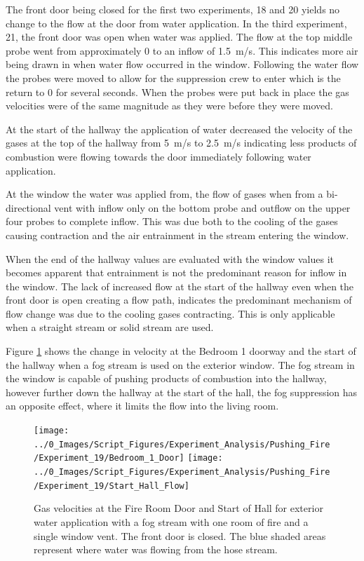 \documentclass[12pt,oneside]{book}
\begin{document}
The front door being closed for the first two experiments, 18 and 20 yields no change to the flow at the door from water application. In the third experiment, 21, the front door was open when water was applied. The flow at the top middle probe went from approximately 0 to an inflow of 1.5~m/s. This indicates more air being drawn in when water flow occurred in the window. Following the water flow the probes were moved to allow for the suppression crew to enter which is the return to 0 for several seconds. When the probes were put back in place the gas velocities were of the same magnitude as they were before they were moved. 

At the start of the hallway the application of water decreased the velocity of the gases at the top of the hallway from 5~m/s to 2.5~m/s indicating less products of combustion were flowing towards the door immediately following water application.

At the window the water was applied from, the flow of gases when from a bi-directional vent with inflow only on the bottom probe and outflow on the upper four probes to complete inflow. This was due both to the cooling of the gases causing contraction and the air entrainment in the stream entering the window. 

When the end of the hallway values are evaluated with the window values it becomes apparent that entrainment is not the predominant reason for inflow in the window. The lack of increased flow at the start of the hallway even when the front door is open creating a flow path, indicates the predominant mechanism of flow change was due to the cooling gases contracting. This is only applicable when a straight stream or solid stream are used. 

Figure \ref{fig:push_fire_dead_end_fog} shows the change in velocity at the Bedroom 1 doorway and the start of the hallway when a fog stream is used on the exterior window.  The fog stream in the window is capable of pushing products of combustion into the hallway, however further down the hallway at the start of the hall, the fog suppression has an opposite effect, where it limits the flow into the living room. 

\begin{figure}[H]
\centering
\texttt{[image: ../0\_Images/Script\_Figures/Experiment\_Analysis/Pushing\_Fire/Experiment\_19/Bedroom\_1\_Door]}
\texttt{[image: ../0\_Images/Script\_Figures/Experiment\_Analysis/Pushing\_Fire/Experiment\_19/Start\_Hall\_Flow]}
\caption[Gas Velocities - Single Room of Fire - Exterior Fog]{Gas velocities at the Fire Room Door and Start of Hall for exterior water application with a fog stream with one room of fire and a single window vent. The front door is closed. The blue shaded areas represent where water was flowing from the hose stream.}
\label{fig:push_fire_dead_end_fog}
\end{figure}
\end{document}
